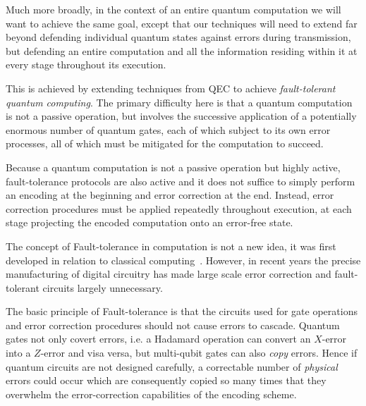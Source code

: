 Much more broadly, in the context of an entire quantum computation we will want to achieve the same goal, except that our techniques will need to extend far beyond defending individual quantum states against errors during transmission, but defending an entire computation and all the information residing within it at every stage throughout its execution.

This is achieved by extending techniques from QEC to achieve \textit{fault-tolerant quantum computing}. The primary difficulty here is that a quantum computation is not a passive operation, but involves the successive application of a potentially enormous number of quantum gates, each of which subject to its own error processes, all of which must be mitigated for the computation to succeed.

Because a quantum computation is not a passive operation but highly active, fault-tolerance protocols are also active and it does not suffice to simply perform an encoding at the beginning and error correction at the end. Instead, error correction procedures must be applied repeatedly throughout execution, at each stage projecting the encoded computation onto an error-free state.


The concept of Fault-tolerance in computation is not a new idea, it was first developed 
in relation to classical computing~\cite{bib:N55,bib:G83,bib:A87}.  However, in recent years the precise manufacturing 
of digital circuitry has made large scale error correction and fault-tolerant circuits largely unnecessary.

The basic principle of Fault-tolerance is that the circuits used for gate operations and 
error correction procedures should not cause errors to cascade.  Quantum gates not only covert errors, i.e. a Hadamard operation can convert an $X$-error into a $Z$-error and visa versa, but multi-qubit gates can also {\it copy} errors.  
Hence if quantum circuits are not designed carefully, a correctable number of {\it physical} errors could occur which are consequently copied so many times that they overwhelm the error-correction capabilities of the encoding scheme.  

